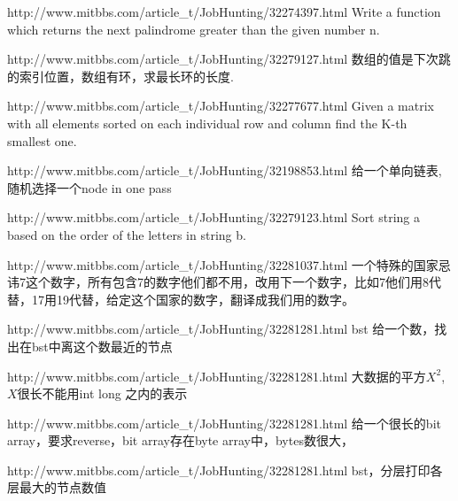 \documentclass[a4paper]{article}
\begin{document}
\begin{CJK}{UTF8}{gbsn}
\begin{enumerate}
\begin{Q}[Google]{http://www.mitbbs.com/article_t/JobHunting/32274397.html}
Write a function which returns the next palindrome greater than the given number n.
\end{Q}

\begin{Q}[Google]{http://www.mitbbs.com/article_t/JobHunting/32279127.html}
数组的值是下次跳的索引位置，数组有环，求最长环的长度.
\end{Q}

\begin{Q}[Twitter]{http://www.mitbbs.com/article_t/JobHunting/32277677.html}
Given a matrix with all elements sorted on each individual row and column find the K-th smallest one.
\end{Q}

\begin{Q}[Facebook]{http://www.mitbbs.com/article_t/JobHunting/32198853.html}
给一个单向链表,随机选择一个node in one pass
\end{Q}

\begin{Q}[Amazon]{http://www.mitbbs.com/article_t/JobHunting/32279123.html}
Sort string a based on the order of the letters in string b.
\end{Q}

\begin{Q}[Google]{http://www.mitbbs.com/article_t/JobHunting/32281037.html}
一个特殊的国家忌讳7这个数字，所有包含7的数字他们都不用，改用下一个数字，比如7他们用8代替，17用19代替，给定这个国家的数字，翻译成我们用的数字。
\end{Q}

\begin{Q}[Google]{http://www.mitbbs.com/article_t/JobHunting/32281281.html}
bst 给一个数，找出在bst中离这个数最近的节点
\end{Q}

\begin{Q}[Google]{http://www.mitbbs.com/article_t/JobHunting/32281281.html}
大数据的平方$X^2$, $X$很长不能用int long 之内的表示
\end{Q}

\begin{Q}[Google]{http://www.mitbbs.com/article_t/JobHunting/32281281.html}
给一个很长的bit array，要求reverse，bit array存在byte array中，bytes数很大，
\end{Q}

\begin{Q}[Google]{http://www.mitbbs.com/article_t/JobHunting/32281281.html}
bst，分层打印各层最大的节点数值
\end{Q}


\end{enumerate}
\end{CJK}
\end{document}
